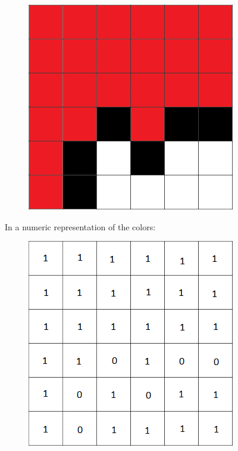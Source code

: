 \documentclass[11pt,oneside]{book}
\makeatletter
\def\maxwidth#1{\ifdim\Gin@nat@width>#1 #1\else\Gin@nat@width\fi}
\makeatother
\begin{document}
\vspace{5px}\begin{figure}[H]\centering
        \includegraphics[width=0.66\maxwidth{\textwidth}]{bucket2.png}
        \end{figure}

In a numeric representation of the colors:

\vspace{5px}\begin{figure}[H]\centering
        \includegraphics[width=0.66\maxwidth{\textwidth}]{bucket3.png}
        \end{figure}
\end{document}
